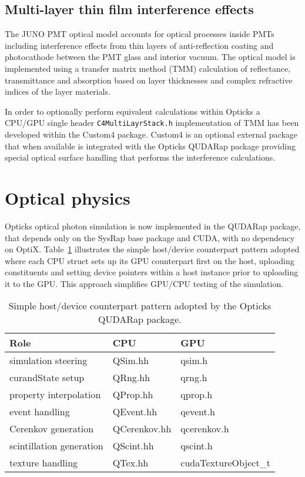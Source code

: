\documentclass{webofc}
\begin{document}
%
%
\subsection{Multi-layer thin film interference effects} 
%
The JUNO PMT optical model\cite{jpom} accounts for optical processes inside PMTs including 
interference effects from thin layers of anti-reflection coating and photocathode between 
the PMT glass and interior vacuum. The optical model is implemented using a transfer matrix method (TMM) 
calculation of reflectance, transmittance and absorption based on layer thicknesses 
and complex refractive indices of the layer materials. 

In order to optionally perform equivalent calculations within Opticks a CPU/GPU 
single header {\tt C4MultiLayrStack.h} implementation of TMM 
has been developed within the Custom4 package\cite{custom4}. 
Custom4 is an optional external package that when available 
is integrated with the Opticks QUDARap package providing special 
optical surface handling that performs the interference calculations.   
%
%
%
\section{Optical physics}%
%
Opticks optical photon simulation is now implemented in the QUDARap package, 
that depends only on the SysRap base package and CUDA, with no dependency on OptiX. 
Table~\ref{tabqsim} illustrates the simple host/device counterpart pattern 
adopted where each CPU struct sets up its GPU counterpart first on the host, 
uploading constituents and setting device pointers within a host instance prior to uploading it 
to the GPU. This approach simplifies GPU/CPU testing of the simulation.  
%
%
\begin{table}
\begin{center}
\begin{tabular}{ |m{40mm}|m{30mm}|m{30mm}| } 
\hline
     Role                          & CPU             & GPU                   \\    
 \hline\hline
     simulation steering           & QSim.hh         &  qsim.h               \\   
     curandState setup             & QRng.hh         &  qrng.h               \\   
     property interpolation        & QProp.hh        &  qprop.h              \\   
     event handling                & QEvent.hh       &  qevent.h             \\    
     Cerenkov generation           & QCerenkov.hh    &  qcerenkov.h          \\    
     scintillation generation      & QScint.hh       &  qscint.h             \\    
     texture handling              & QTex.hh         &  cudaTextureObject\_t \\
 \hline
\end{tabular}
\end{center}
\caption{\label{tabqsim}Simple host/device counterpart pattern adopted by the Opticks QUDARap package.} 
\vspace{-4mm}
\end{table}%
%
%
\end{document}
